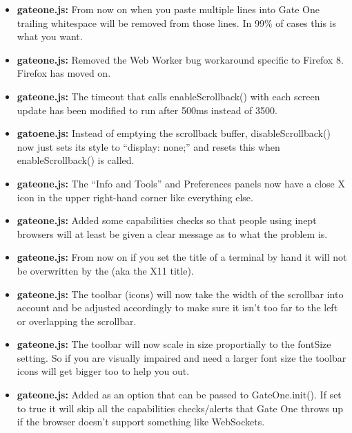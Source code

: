 \documentclass[letterpaper,10pt,openany]{sphinxmanual}
\begin{document}
\begin{itemize}
\item {} 
\textbf{gateone.js:}  From now on when you paste multiple lines into Gate One trailing whitespace will be removed from those lines.  In 99\% of cases this is what you want.

\item {} 
\textbf{gateone.js:}  Removed the Web Worker bug workaround specific to Firefox 8.  Firefox has moved on.

\item {} 
\textbf{gateone.js:}  The timeout that calls enableScrollback() with each screen update has been modified to run after 500ms instead of 3500.

\item {} 
\textbf{gatoene.js:}  Instead of emptying the scrollback buffer, disableScrollback() now just sets its style to ``display: none;'' and resets this when enableScrollback() is called.

\item {} 
\textbf{gateone.js:}  The ``Info and Tools'' and Preferences panels now have a close X icon in the upper right-hand corner like everything else.

\item {} 
\textbf{gateone.js:}  Added some capabilities checks so that people using inept browsers will at least be given a clear message as to what the problem is.

\item {} 
\textbf{gateone.js:}  From now on if you set the title of a terminal by hand it will not be overwritten by the  (aka the X11 title).

\item {} 
\textbf{gateone.js:}  The toolbar (icons) will now take the width of the scrollbar into account and be adjusted accordingly to make sure it isn't too far to the left or overlapping the scrollbar.

\item {} 
\textbf{gateone.js:}  The toolbar will now scale in size proportially to the fontSize setting.  So if you are visually impaired and need a larger font size the toolbar icons will get bigger too to help you out.

\item {} 
\textbf{gateone.js:}  Added  as an option that can be passed to GateOne.init().  If set to true it will skip all the capabilities checks/alerts that Gate One throws up if the browser doesn't support something like WebSockets.


\end{itemize}
\end{document}
